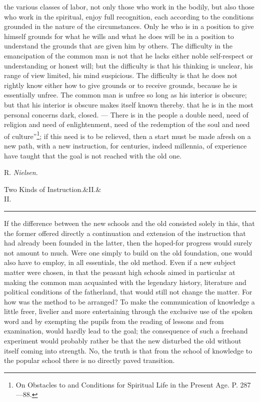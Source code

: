 \documentclass[12pt,a4paper,openany]{book}
\newcommand{\opage}[1]{\marginnote{\footnotesize\textit{[#1]}}}
\newcommand{\essayhead}[2]{\begin{center}{\large #1}\ifx&#2&\else\\[0.3em]{\normalsize #2}\fi\\[0.5em]\rule{3em}{0.4pt}\end{center}\medskip\noindent}
\newcommand{\signature}[1]{\par\smallskip\hfill #1\hspace*{2em}\par}
\begin{document}
the various classes of labor, not only those who
work in the bodily, but also those who work in
the spiritual, enjoy full recognition, each according to the conditions
grounded in the nature of the circumstances. Only he who
\setcounter{footnote}{0}%
\opage{323}is in a position to give himself grounds for what he wills
and what he does will be in a position to understand the
grounds that are given him by others. The difficulty in
the emancipation of the common man is not that he lacks
either noble self-respect or understanding or honest will;
but the difficulty is that his thinking is unclear, his
range of view limited, his mind suspicious. The difficulty
is that he does not rightly know either how to give grounds
or to receive grounds, because he is essentially unfree.
The common man is unfree so long as his interior is obscure;
but that his interior is obscure makes itself known thereby. that   %
he is in the most personal concerns dark,
closed. --- There is in the people a double need, need
of religion and need of enlightenment, need of the redemption of the soul
and need of culture''\footnote[1]{On Obstacles to and Conditions for Spiritual Life in the Present Age. P. 287---88.}; if this need is to be relieved,
then a start must be made afresh on a new path,
with a new instruction, for centuries, indeed millennia,
of experience have taught that the goal is not reached with
the old one.
\signature{R. \emph{Nielsen}.}

\clearpage
\essayhead{Two Kinds of Instruction.}{II.}
\setcounter{footnote}{0}%
\opage{409}If the difference between the new schools and the old consisted
solely in this, that the former offered directly a continuation
and extension of the instruction that had already been
founded in the latter, then the hoped-for progress would
surely not amount to much. Were one simply to
build on the old foundation, one would also have to employ,
in all essentials, the old method. Even if a new subject matter
were chosen, in that the peasant high schools aimed in particular
at making the common man acquainted with the legendary history,
literature and political conditions of the fatherland, that would
still not change the matter. For how was the method to be arranged?
To make the communication of knowledge a little freer,
livelier and more entertaining through the exclusive use of the
spoken word and by exempting the pupils from the reading of lessons
and from examination, would hardly lead to the goal; the consequence of such
a freehand experiment would probably rather be that the
new disturbed the old without itself coming into strength.
No, the truth is that from the school of knowledge to
the popular school there is no directly paved transition.
\end{document}
